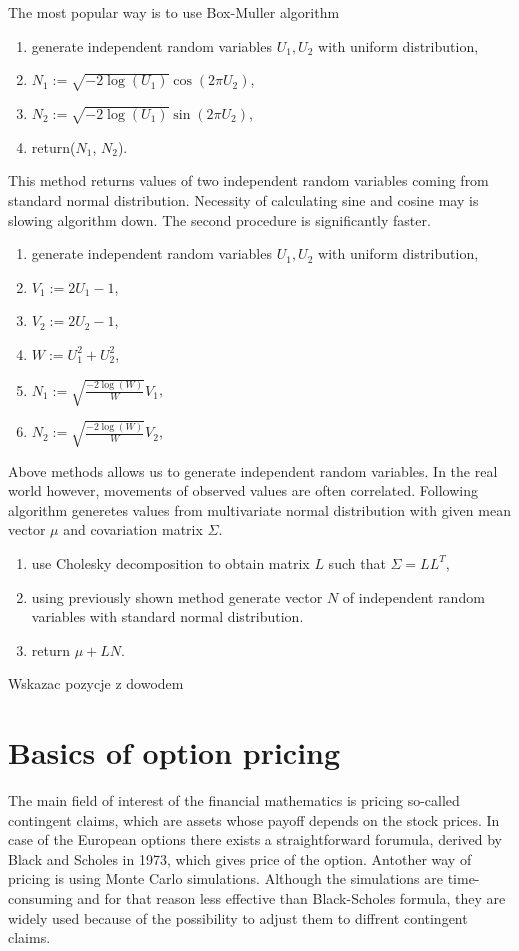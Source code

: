 \documentclass[a4paper,12pt, twoside]{book}
\theoremstyle{definition}
\theoremstyle{remark}
\begin{document}
The most popular way is to use Box-Muller algorithm
\begin{enumerate}
 \item generate independent random variables $U_1, U_2$ with uniform distribution,
 \item $N_1 := \sqrt{-2\log(U_1)} \cos(2\pi U_2)$,
 \item $N_2 := \sqrt{-2\log(U_1)} \sin(2\pi U_2)$,
 \item return($N_1$, $N_2$).
\end{enumerate}
This method returns values of two independent random variables coming from standard normal distribution. Necessity of calculating sine and cosine may is slowing algorithm down. The second procedure is significantly faster.
\begin{enumerate}
 \item generate independent random variables $U_1, U_2$ with uniform distribution,
 \item $V_1 := 2U_1-1$,
 \item $V_2 := 2U_2-1$,
 \item $W := U_1^2 + U_2^2$,
 \item $N_1 := \sqrt{\frac{-2\log(W)}{W}} V_1$,
 \item $N_2 := \sqrt{\frac{-2\log(W)}{W}} V_2$,
\end{enumerate}

Above methods allows us to generate independent random variables. In the real world however, movements of observed values are often correlated. Following algorithm generetes values from multivariate normal distribution with given mean vector $\mu$ and covariation matrix $\Sigma$. 
\begin{enumerate}
 \item use Cholesky decomposition to obtain matrix $L$ such that $\Sigma = LL^T$,
 \item using previously shown method generate vector $N$ of independent random variables with standard normal distribution.
 \item return $\mu + LN$.
\end{enumerate}
{\Large \color{red} Wskazac pozycje z dowodem}


\chapter{Basics of option pricing}
The main field of interest of the financial mathematics is pricing so-called contingent claims, which are assets whose payoff depends on the stock prices. In case of the European options there exists a straightforward forumula, derived by Black and Scholes in 1973, which gives price of the option. Antother way of pricing is using Monte Carlo simulations. Although the simulations are time-consuming and for that reason less effective than Black-Scholes formula, they are widely used because of the possibility to adjust them to diffrent contingent claims. 
\end{document}
